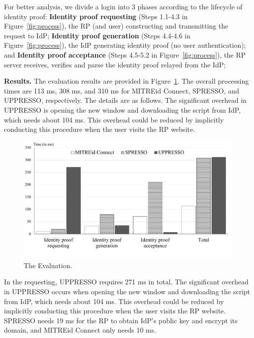 For better analysis, we divide a login into 3 phases according to the lifecycle of identity proof:
 \textbf{Identity proof requesting} (Steps 1.1-4.3 in Figure~\ref{fig:process}), the RP (and user) constructing and transmitting the request to IdP;
 \textbf{Identity proof generation} (Steps 4.4-4.6 in Figure~\ref{fig:process}), the IdP generating identity proof (no user authentication);
and  \textbf{Identity proof acceptance} (Steps 4.5-5.2 in Figure~\ref{fig:process}), the RP server receives, verifies and parse the identity proof relayed from the IdP;

\noindent\textbf{Results.}
The evaluation results are provided in Figure~\ref{fig:evaluation}.
The overall processing times are  113 ms, 308 ms, and 310 ms for MITREid Connect, SPRESSO, and UPPRESSO, respectively. The details are as follows.
The significant overhead  in UPPRESSO is opening the new window and downloading the script from IdP, which needs about 104 ms. This overhead could be reduced by implicitly conducting this procedure when the user visits the RP website.


\begin{figure}
  \centering
  \includegraphics[width=0.9\linewidth]{fig/evaluation2.pdf}
  \vspace{-6mm}
  \caption{The Evaluation.}
  \label{fig:evaluation}
\vspace{-7mm}
\end{figure}

In the requesting, UPPRESSO requires 271 ms in total.
The significant overhead  in UPPRESSO occurs when opening the new window and downloading the script from IdP, which needs about 104 ms. This overhead could be reduced by implicitly conducting this procedure when the user visits the RP website.
SPRESSO needs 19 ms for the RP to obtain IdP's public key and encrypt its domain,
and MITREid Connect only needs 10 ms.



